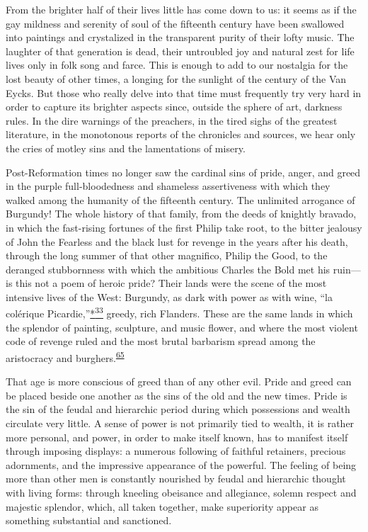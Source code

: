 From the brighter half of their lives little has come down to us: it
seems as if the gay mildness and serenity of soul of the fifteenth
century have been swallowed into paintings and crystalized in the
transparent purity of their lofty music. The laughter of that generation
is dead, their untroubled joy and natural zest for life lives only in
folk song and farce. This is enough to add to our nostalgia for the lost
beauty of other times, a longing for the sunlight of the century of the
Van Eycks. But those who really delve into that time must frequently try
very hard in order to capture its brighter aspects since, outside the
sphere of art, darkness rules. In the dire warnings of the preachers, in
the tired sighs of the greatest literature, in the monotonous reports of
the chronicles and sources, we hear only the cries of motley sins and
the lamentations of misery.

Post-Reformation times no longer saw the cardinal sins of pride, anger,
and greed in the purple full-bloodedness and shameless assertiveness
with which they walked among the humanity of the fifteenth century. The
unlimited arrogance of Burgundy! The
\protect\hypertarget{08_Chapter_One__THE_PASSIONATE_INTE.xhtmlux5cux23page_25}{}{}whole
history of that family, from the deeds of knightly bravado, in which the
fast-rising fortunes of the first Philip take root, to the bitter
jealousy of John the Fearless and the black lust for revenge in the
years after his death, through the long summer of that other magnifico,
Philip the Good, to the deranged stubbornness with which the ambitious
Charles the Bold met his ruin---is this not a poem of heroic pride?
Their lands were the scene of the most intensive lives of the West:
Burgundy, as dark with power as with wine, ``la colérique
Picardie,''\protect\hypertarget{08_Chapter_One__THE_PASSIONATE_INTE.xhtmlux5cux23id_2399}{\protect\hyperlink{23_NOTES.xhtmlux5cux23id_2400}{*\textsuperscript{33}}}
greedy, rich Flanders. These are the same lands in which the splendor of
painting, sculpture, and music flower, and where the most violent code
of revenge ruled and the most brutal barbarism spread among the
aristocracy and
burghers.\textsuperscript{\protect\hypertarget{08_Chapter_One__THE_PASSIONATE_INTE.xhtmlux5cux23id_2102}{\protect\hyperlink{23_NOTES.xhtmlux5cux23page_401}{65}}}

That age is more conscious of greed than of any other evil. Pride and
greed can be placed beside one another as the sins of the old and the
new times. Pride is the sin of the feudal and hierarchic period during
which possessions and wealth circulate very little. A sense of power is
not primarily tied to wealth, it is rather more personal, and power, in
order to make itself known, has to manifest itself through imposing
displays: a numerous following of faithful retainers, precious
adornments, and the impressive appearance of the powerful. The feeling
of being more than other men is constantly nourished by feudal and
hierarchic thought with living forms: through kneeling obeisance and
allegiance, solemn respect and majestic splendor, which, all taken
together, make superiority appear as something substantial and
sanctioned.

